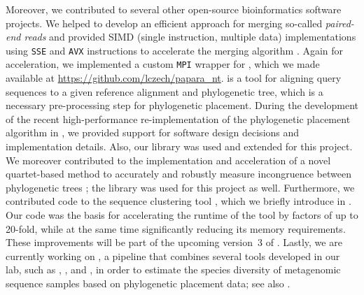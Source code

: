 Moreover, we contributed to several other open-source bioinformatics software projects.
We helped to develop an efficient approach for merging so-called \emph{paired-end reads}
and provided SIMD (single instruction, multiple data) implementations using \texttt{SSE} and \texttt{AVX} instructions
to accelerate the merging algorithm \cite{Flouri2017}.
Again for acceleration, we implemented a custom \texttt{\acs{MPI}} wrapper for  \cite{Berger2011a,Berger2012},
which we made available at \url{https://github.com/lczech/papara_nt}.
 is a tool for aligning query sequences to a given reference alignment and phylogenetic tree,
which is a necessary pre-processing step for phylogenetic placement.
During the development of the recent high-performance re-implementation of the phylogenetic placement algorithm
in  \cite{Barbera2018}, we provided support for software design decisions and implementation details.
Also, our  library was used and extended for this project.
We moreover contributed to the implementation and acceleration of a novel quartet-based method to accurately and robustly
measure incongruence between phylogenetic trees \cite{Zhou2017};
the  library was used for this project as well.
Furthermore, we contributed code to the sequence clustering tool  \cite{Mahe2014,Mahe2015},
which we briefly introduce in .
Our code was the basis for accelerating the runtime of the tool by factors of up to \num{20}-fold,
while at the same time significantly reducing its memory requirements.
These improvements will be part of the upcoming version~3 of .
Lastly, we are currently working on ,
a pipeline that combines several tools developed in our lab, such as
 \cite{Barbera2018},  \cite{Morel2019}, and  \cite{Kapli2017},
in order to estimate the species diversity of metagenomic sequence samples based on phylogenetic placement data;
see also .



